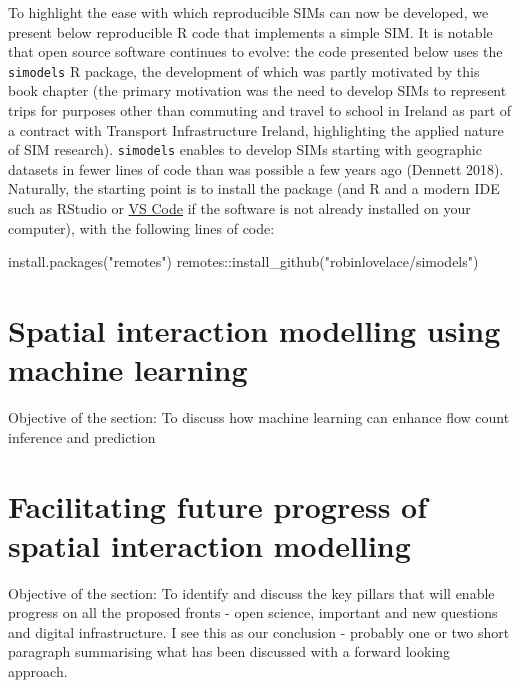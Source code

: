 \documentclass[11pt,letterpaper]{article}
\newenvironment{Shaded}{\begin{snugshade}}{\end{snugshade}}
\newcommand{\FunctionTok}[1]{\textcolor[rgb]{0.00,0.00,0.00}{#1}}
\newcommand{\NormalTok}[1]{#1}
\newcommand{\SpecialCharTok}[1]{\textcolor[rgb]{0.00,0.00,0.00}{#1}}
\newcommand{\StringTok}[1]{\textcolor[rgb]{0.31,0.60,0.02}{#1}}
\begin{document}
To highlight the ease with which reproducible SIMs can now be developed, we present below reproducible R code that implements a simple SIM.
It is notable that open source software continues to evolve: the code presented below uses the \texttt{simodels} R package, the development of which was partly motivated by this book chapter (the primary motivation was the need to develop SIMs to represent trips for purposes other than commuting and travel to school in Ireland as part of a contract with Transport Infrastructure Ireland, highlighting the applied nature of SIM research).
\texttt{simodels} enables to develop SIMs starting with geographic datasets in fewer lines of code than was possible a few years ago (Dennett 2018).
Naturally, the starting point is to install the package (and R and a modern IDE such as RStudio or \href{https://marketplace.visualstudio.com/items?itemName=REditorSupport.r}{VS Code} if the software is not already installed on your computer), with the following lines of code:

\begin{Shaded}
\begin{Highlighting}[]
\FunctionTok{install.packages}\NormalTok{(}\StringTok{"remotes"}\NormalTok{)}
\NormalTok{remotes}\SpecialCharTok{::}\FunctionTok{install\_github}\NormalTok{(}\StringTok{"robinlovelace/simodels"}\NormalTok{)}
\end{Highlighting}
\end{Shaded}

\hypertarget{spatial-interaction-modelling-using-machine-learning}{%
\section{Spatial interaction modelling using machine learning}\label{spatial-interaction-modelling-using-machine-learning}}

Objective of the section: To discuss how machine learning can enhance flow count inference and prediction

\hypertarget{facilitating-future-progress-of-spatial-interaction-modelling}{%
\section{Facilitating future progress of spatial interaction modelling}\label{facilitating-future-progress-of-spatial-interaction-modelling}}

Objective of the section: To identify and discuss the key pillars that will enable progress on all the proposed fronts - open science, important and new questions and digital infrastructure.
I see this as our conclusion - probably one or two short paragraph summarising what has been discussed with a forward looking approach.
\end{document}
